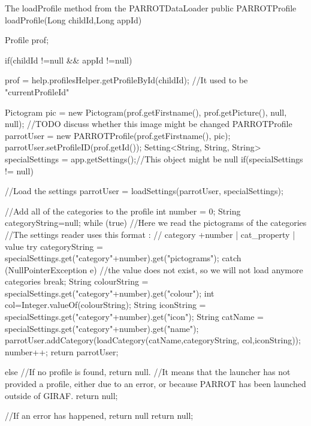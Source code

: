 \begin{source}[{lPf}]{The loadProfile method from the PARROTDataLoader}
public PARROTProfile loadProfile(Long childId,Long appId)	
	{
		Profile prof;

		if(childId !=null && appId !=null)
		{
			prof = help.profilesHelper.getProfileById(childId);	//It used to be "currentProfileId"

			Pictogram pic = new Pictogram(prof.getFirstname(), prof.getPicture(), null, null);	//TODO discuss whether this image might be changed
			PARROTProfile parrotUser = new PARROTProfile(prof.getFirstname(), pic);
			parrotUser.setProfileID(prof.getId());
			Setting<String, String, String> specialSettings = app.getSettings();//This object might be null
			if(specialSettings != null)
			{
				//Load the settings
				parrotUser = loadSettings(parrotUser, specialSettings);

				//Add all of the categories to the profile
				int number = 0;
				String categoryString=null;
				while (true)
				{
					//Here we read the pictograms of the categories
					//The settings reader uses this format :
					// category +number | cat_property | value
					try
					{
						categoryString = specialSettings.get("category"+number).get("pictograms");
					}
					catch (NullPointerException e)
					{
						//the value does not exist, so we will not load anymore categories
						break;
					}
					String colourString = specialSettings.get("category"+number).get("colour");
					int col=Integer.valueOf(colourString);
					String iconString = specialSettings.get("category"+number).get("icon");
					String catName = specialSettings.get("category"+number).get("name");
					parrotUser.addCategory(loadCategory(catName,categoryString,
						col,iconString));
					number++;
				}
				return parrotUser;
			}
			else
			{
				//If no profile is found, return null.
				//It means that the launcher has not provided a profile, either due to an error, or because PARROT has been launched outside of GIRAF.
				return null;
			}
		}
		//If an error has happened, return null
		return null;
	}
\end{source}

